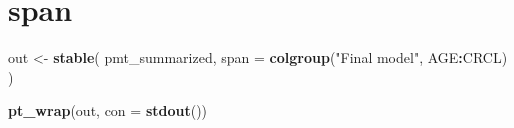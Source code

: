 \documentclass[
]{article}
\newenvironment{Shaded}{\begin{snugshade}}{\end{snugshade}}
\newcommand{\ControlFlowTok}[1]{\textcolor[rgb]{0.13,0.29,0.53}{\textbf{#1}}}
\newcommand{\DataTypeTok}[1]{\textcolor[rgb]{0.13,0.29,0.53}{#1}}
\newcommand{\KeywordTok}[1]{\textcolor[rgb]{0.13,0.29,0.53}{\textbf{#1}}}
\newcommand{\NormalTok}[1]{#1}
\newcommand{\OperatorTok}[1]{\textcolor[rgb]{0.81,0.36,0.00}{\textbf{#1}}}
\newcommand{\StringTok}[1]{\textcolor[rgb]{0.31,0.60,0.02}{#1}}
\begin{document}
\begin{Shaded}
\end{Shaded}

\clearpage

\hypertarget{span}{%
\section{span}\label{span}}

\begin{Shaded}
\begin{Highlighting}[]
\NormalTok{out <-}\StringTok{ }\KeywordTok{stable}\NormalTok{(}
\NormalTok{  pmt_summarized, }
  \DataTypeTok{span =} \KeywordTok{colgroup}\NormalTok{(}\StringTok{"Final model"}\NormalTok{, AGE}\OperatorTok{:}\NormalTok{CRCL)}
\NormalTok{)}

\KeywordTok{pt_wrap}\NormalTok{(out, }\DataTypeTok{con =} \KeywordTok{stdout}\NormalTok{()) }
\end{Highlighting}
\end{Shaded}
\end{document}
